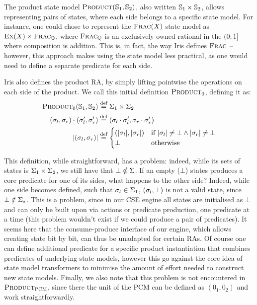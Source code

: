 The product state model $\textsc{Product}(\mathbb S_1, \mathbb S_2)$, also written $\mathbb S_1 \times \mathbb S_2$, allows representing pairs of states, where each side belongs to a specific state model. For instance, one could chose to represent the $\textsc{Frac}(X)$ state model as $\textsc{Ex}(X) \times \textsc{Frac}_{\mathbb{Q}}$, where $\textsc{Frac}_{\mathbb{Q}}$ is an exclusively owned rational in the $(0;1]$ where composition is addition. This is, in fact, the way Iris defines $\textsc{Frac}$ \cite{iris-thesis} -- however, this approach makes using the state model less practical, as one would need to define a separate predicate for each side.

Iris also defines the product RA, by simply lifting pointwise the operations on each side of the product. We call this initial definition $\textsc{Product}_0$, defining it as: \begin{align*}
 	\textsc{Product}_0(\mathbb S_1,\mathbb S_2)&\stackrel{\textnormal{def}}= \Sigma_1 \times \Sigma_2\\
 	(\sigma_l,\sigma_r)\cdot(\sigma_l',\sigma_r') &\stackrel{\textnormal{def}}= (\sigma_l\cdot \sigma_l',\sigma_r\cdot \sigma_r')\\
 	|(\sigma_l,\sigma_r)|&\stackrel{\textnormal{def}}= \begin{cases}
(|\sigma_l|, |\sigma_r|) &\text{if}~|\sigma_l|\neq\bot \land |\sigma_r|\neq\bot\\
\bot&\text{otherwise}
\end{cases}
\end{align*}

This definition, while straightforward, has a problem: indeed, while its sets of states is $\Sigma_1\times\Sigma_2$, we still have that $\bot\notin\Sigma$. If an empty ($\bot$) states produces a core predicate for one of its sides, what happens to the other side? Indeed, while one side becomes defined, such that $\sigma_l\in\Sigma_1$, $(\sigma_l, \bot)$ is not a valid state, since $\bot \notin \Sigma_s$. This is a problem, since in our CSE engine all states are initialised as $\bot$ and can only be built upon via actions or predicate production, one predicate at a time (this problem wouldn't exist if we could produce a pair of predicates). It seems here that the consume-produce interface of our engine, which allows creating state bit by bit, can thus be unadapted for certain RAs. Of course one can define additional predicate for a specific product instantiation that combines predicates of underlying state models, however this go against the core idea of state model transformers to minimise the amount of effort needed to construct new state models. Finally, we also note that this problem is not encountered in $\textsc{Product}_{\textsc{PCM}}$, since there the unit of the PCM can be defined as $(0_1, 0_2)$ and work straightforwardly.

